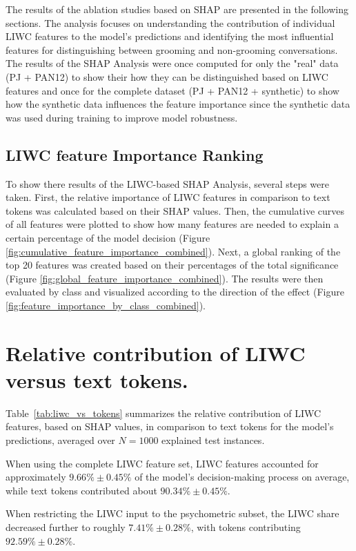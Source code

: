 The results of the ablation studies based on SHAP are presented in the following sections. The analysis focuses on understanding the contribution of individual LIWC features to the model's predictions and identifying the most influential features for distinguishing between grooming and non-grooming conversations. The results of the SHAP Analysis were once computed for only the "real" data (PJ + PAN12) to show their how they can be distinguished based on LIWC features and once for the complete dataset (PJ + PAN12 + synthetic) to show how the synthetic data influences the feature importance since the synthetic data was used during training to improve model robustness. 

\subsection{LIWC feature Importance Ranking} 

To show there results of the LIWC-based SHAP Analysis, several steps were taken. First, the relative importance of LIWC features in comparison to text tokens was calculated based on their SHAP values. Then, the cumulative curves of all features were plotted to show how many features are needed to explain a certain percentage of the model decision (Figure \ref{fig:cumulative_feature_importance_combined}). Next, a global ranking of the top 20 features was created based on their percentages of the total significance (Figure \ref{fig:global_feature_importance_combined}). The results were then evaluated by class and visualized according to the direction of the effect (Figure \ref{fig:feature_importance_by_class_combined}).

\section{Relative contribution of LIWC versus text tokens.}

Table~\ref{tab:liwc_vs_tokens} summarizes the relative contribution of LIWC features, based on SHAP values, in comparison to text tokens for the model’s predictions, averaged over $N = 1000$ explained test instances.  

When using the complete LIWC feature set, LIWC features accounted for approximately $9.66\% \pm 0.45\%$  of the model’s decision-making process on average, while text tokens contributed about $90.34\% \pm 0.45\%$.  

When restricting the LIWC input to the psychometric subset, the LIWC share decreased further to roughly $7.41\% \pm 0.28\%$, with tokens contributing $92.59\% \pm 0.28\%$.  

